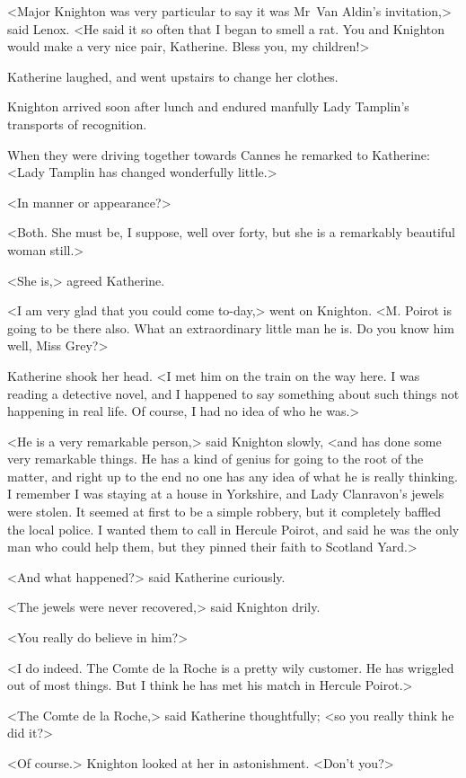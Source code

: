 <Major Knighton was very particular to say it was Mr~Van Aldin's invitation,> said Lenox. <He said it so often that I began to smell a rat. You and Knighton would make a very nice pair, Katherine. Bless you, my children!>

Katherine laughed, and went upstairs to change her clothes.

Knighton arrived soon after lunch and endured manfully Lady Tamplin's transports of recognition.

When they were driving together towards Cannes he remarked to Katherine: <Lady Tamplin has changed wonderfully little.>

<In manner or appearance?>

<Both. She must be, I suppose, well over forty, but she is a remarkably beautiful woman still.>

<She is,> agreed Katherine.

<I am very glad that you could come to-day,> went on Knighton. <M. Poirot is going to be there also. What an extraordinary little man he is. Do you know him well, Miss Grey?>

Katherine shook her head. <I met him on the train on the way here. I was reading a detective novel, and I happened to say something about such things not happening in real life. Of course, I had no idea of who he was.>

<He is a very remarkable person,> said Knighton slowly, <and has done some very remarkable things. He has a kind of genius for going to the root of the matter, and right up to the end no one has any idea of what he is really thinking. I remember I was staying at a house in Yorkshire, and Lady Clanravon's jewels were stolen. It seemed at first to be a simple robbery, but it completely baffled the local police. I wanted them to call in Hercule Poirot, and said he was the only man who could help them, but they pinned their faith to Scotland Yard.>

<And what happened?> said Katherine curiously.

<The jewels were never recovered,> said Knighton drily.

<You really do believe in him?>

<I do indeed. The Comte de la Roche is a pretty wily customer. He has wriggled out of most things. But I think he has met his match in Hercule Poirot.>

<The Comte de la Roche,> said Katherine thoughtfully; <so you really think he did it?>

<Of course.> Knighton looked at her in astonishment. <Don't you?>

